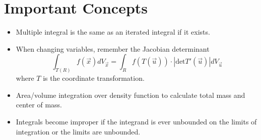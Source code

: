 \documentclass[11pt]{article}
\begin{document}
\section*{Important Concepts}
	\begin{itemize}
		\item Multiple integral is the same as an iterated integral if it exists.
		\item When changing variables, remember the Jacobian determinant
			\begin{equation}
				\int_{T(R)} f(\vec{x})dV_{\vec{x}} = \int_R f(T(\vec{u}))\cdot|\text{det}T'(\vec{u})|dV_{\vec{u}}
			\end{equation}
			where $T$ is the coordinate transformation.
		\item Area/volume integration over density function to calculate total mass and center of mass.
		\item Integrals become improper if the integrand is ever unbounded on the limits of integration or the limits are unbounded.
	\end{itemize}
%		
%		


\end{document}
